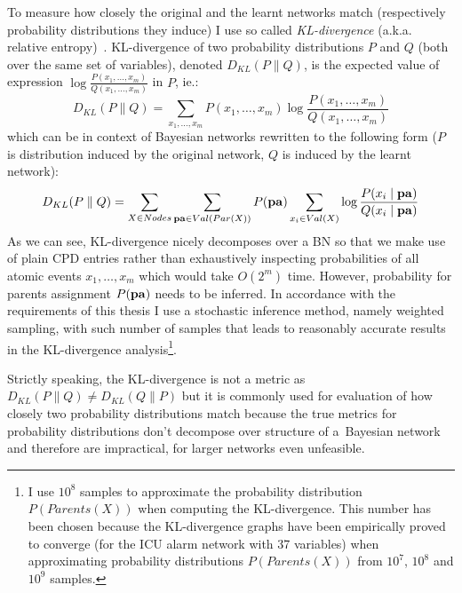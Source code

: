 \documentclass[english,cover]{fitthesis} %
\newcommand{\term}[1]{\emph{#1}}           %
\newcommand{\vars}[1]{{\bold{#1}}}         %
\begin{document}
To measure how closely the original and the learnt networks match (respectively probability distributions they induce) I use so called \term{KL-divergence} (a.k.a. relative entropy)~\cite{pgm}. KL-divergence of two probability distributions $P$ and $Q$ (both over the same set of variables), denoted $D_{KL}(P \parallel Q)$, is the expected value of expression $\log \frac{P(x_1,\dots,x_m)}{Q(x_1,\dots,x_m)}$ in $P$, ie.:
\begin{equation*}
D_{KL}(P \parallel Q) = \sum_{x_1,\dots,x_m} P(x_1,\dots,x_m) \log \frac{P(x_1,\dots,x_m)}{Q(x_1,\dots,x_m)}
\end{equation*}
which can be in context of Bayesian networks rewritten to the following form ($P$ is distribution induced by the original network, $Q$ is induced by the learnt network):
\begin{equation*}
D_{KL}(P \parallel Q) = \sum_{X \in Nodes} \sum_{\vars{pa} \in Val(Par(X))} P(\vars{pa}) \sum_{x_i \in Val(X)} \log \frac{P(x_i \mid \vars{pa})}{Q(x_i \mid \vars{pa})}
\end{equation*}
As we can see, KL-divergence nicely decomposes over a BN so that we make use of plain CPD entries rather than exhaustively inspecting probabilities of all atomic events $x_1, \dots, x_m$ which would take $O(2^m)$ time. However, probability for parents assignment $P(\vars{pa})$ needs to be inferred. In accordance with the requirements of this thesis I use a stochastic inference method, namely weighted sampling, with such number of samples that leads to reasonably accurate results in the KL-divergence analysis\footnote{I use $10^8$ samples to approximate the probability distribution $P(Parents(X))$ when computing the KL-divergence. This number has been chosen because the KL-divergence graphs have been empirically proved to converge (for the ICU alarm network with 37 variables) when approximating probability distributions $P(Parents(X))$ from $10^7$, $10^8$ and $10^9$ samples.}.

Strictly speaking, the KL-divergence is not a metric as $D_{KL}(P \parallel Q) \neq D_{KL}(Q \parallel P)$ but it is commonly used for evaluation of how closely two probability distributions match because the true metrics for probability distributions don't decompose over structure of a~Bayesian network and therefore are impractical, for larger networks even unfeasible.
\end{document}
